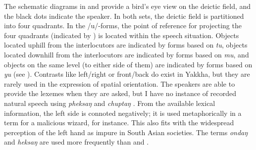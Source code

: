 The schematic diagrams in  and  provide a bird's eye view on the deictic field, and the black dots indicate the speaker. In both sets, the deictic field is partitioned into four quadrants. In the /u/-forms, the point of reference  for projecting the four quadrants (indicated by ) is located within the speech situation. Objects located uphill from the interlocutors are indicated by forms based on \emph{tu}, objects located downhill  from the interlocutors are indicated by forms based on  \emph{mu}, and objects on the same level (to either side of them) are indicated by forms based on \emph{yu} (see ). Contrasts like left/right or front/back do exist in Yakkha, but they are rarely used in the expression of spatial orientation. The speakers are able to provide the lexemes when they are asked, but I have no instance of recorded natural speech using \emph{pheksaŋ}  and \emph{chuptaŋ} . From the available lexical information, the left side is connoted negatively; it is used metaphorically in a term for a malicious wizard, for instance. This also  fits with the widespread perception of the left hand as impure in South Asian societies. The terms \emph{ondaŋ}  and \emph{heksaŋ}  are used more frequently than  and . 

\begin{figure}\RawFloats
\begin{minipage}[t]{.445\textwidth}
\raggedright
\setlength{\fboxsep}{0pt}
\label{deicticschema-1}
\end{minipage}
\begin{minipage}[t]{.545\textwidth}
\centering
\setlength{\fboxsep}{0pt}
\label{deicticschema-2}
\end{minipage}
\end{figure}

